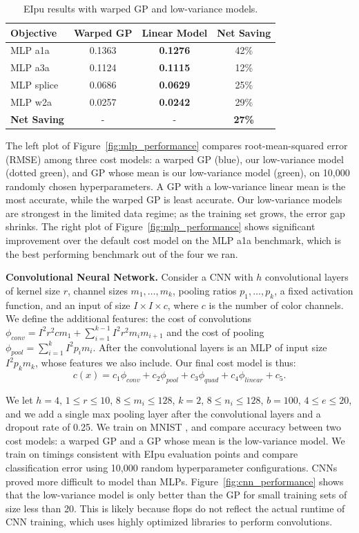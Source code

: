 \documentclass{article}
\begin{document}
\begin{table}[t]
\centering
\small
\setlength\tabcolsep{4pt}
\begin{tabular}{|l c c c | }
\hline
Objective  & Warped GP & Linear Model & Net Saving \\
\hline \hline
MLP a1a 	& 0.1363 & \textbf{0.1276} & 42\% \\ \hline
MLP a3a 	& 0.1124 & \textbf{0.1115} & 12\% \\ \hline
MLP splice  & 0.0686 & \textbf{0.0629} & 25\% \\ \hline
MLP w2a 	& 0.0257 & \textbf{0.0242} & 29\% \\ \hline
\textbf{Net Saving} & - & - & \textbf{27\%} \\ \hline
\end{tabular}
\caption{EIpu results with warped GP and low-variance models.}\label{tab:lowvariance}
\label{table:MLP}
\end{table}

The left plot of Figure~\ref{fig:mlp_performance} compares root-mean-squared error (RMSE) among three cost models: a warped GP (blue), our low-variance model (dotted green), and GP whose mean is our low-variance model (green), on 10,000 randomly chosen hyperparameters. A GP with a low-variance linear mean is the most accurate, while the warped GP is least accurate. Our low-variance models are strongest in the limited data regime; as the training set grows, the error gap shrinks. The right plot of Figure~\ref{fig:mlp_performance} shows significant improvement over the default cost model on the MLP a1a benchmark, which is the best performing benchmark out of the four we ran. 


\textbf{Convolutional Neural Network.} Consider a CNN with $h$ convolutional layers of kernel size $r$, channel sizes $m_1, \dots, m_k$, pooling ratios $p_1, \dots, p_k$, a fixed activation function, and an input of size $I \times I \times c$, where $c$ is the number of color channels. We define the additional features: the cost of convolutions $\phi_{conv} = I^2r^2 c m_1 + \sum_{i=1}^{k-1} I^2r^2 m_{i}m_{i+1}$ and the cost of pooling $\phi_{pool} = \sum_{i=1}^k I^2p_im_i$. After the convolutional layers is an MLP of input size $I^2p_km_k$, whose features we also include. Our final cost model is thus:
$$c(x) = c_1 \phi_{conv} + c_2 \phi_{pool} +  c_3 \phi_{quad} + c_4 \phi_{linear} + c_5.$$

We let $h=4$, $1 \leq r \leq 10$, $8 \leq m_i \leq 128$, $k = 2$, $8 \leq n_i \leq 128$, $b = 100$, $4 \leq e \leq 20$, and we add a single max pooling layer after the convolutional layers and a dropout rate of 0.25. We train on MNIST \cite{lecun1998gradient}, and compare accuracy between two cost models: a warped GP and a GP whose mean is the low-variance model. We train on timings consistent with EIpu evaluation points and compare classification error using 10,000 random hyperparameter configurations. CNNs proved more difficult to model than MLPs. Figure~\ref{fig:cnn_performance} shows that the low-variance model is only better than the GP for small training sets of size less than 20. This is likely because flops do not reflect the actual runtime of CNN training, which uses highly optimized libraries to perform convolutions. 
\end{document}
